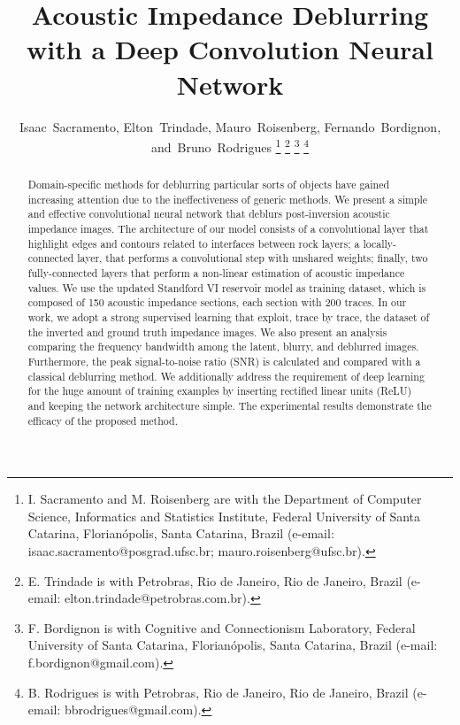 \documentclass[journal]{IEEEtran}
\begin{document}
\title{Acoustic Impedance Deblurring with a Deep Convolution Neural Network}


\author{Isaac~Sacramento,
        Elton~Trindade,
        Mauro~Roisenberg,
        Fernando~Bordignon,
        and~Bruno~Rodrigues
\thanks{I. Sacramento and M. Roisenberg are with the Department of Computer Science, Informatics and Statistics Institute,
Federal University of Santa Catarina, Florianópolis, Santa Catarina, Brazil (e-email: isaac.sacramento@posgrad.ufsc.br;
mauro.roisenberg@ufsc.br).}%
\thanks{E. Trindade is with Petrobras, Rio de Janeiro, Rio de Janeiro, Brazil (e-email: elton.trindade@petrobras.com.br).}%
\thanks{F. Bordignon is with Cognitive and Connectionism Laboratory, Federal University of Santa Catarina, Florianópolis,
Santa Catarina, Brazil (e-mail: f.bordignon@gmail.com).}
\thanks{B. Rodrigues is with Petrobras, Rio de Janeiro, Rio de Janeiro, Brazil (e-email: bbrodrigues@gmail.com).}}

\markboth{}%
{}%

\maketitle

\begin{abstract}
Domain-specific methods for deblurring particular sorts of
objects have gained increasing attention due to the ineffectiveness
of generic methods.
We present a simple and effective convolutional
neural network that deblurs post-inversion acoustic impedance images. 
The architecture of our model consists of a convolutional layer
that highlight edges and contours related to
interfaces between rock layers; a locally-connected
layer, that performs a convolutional step with unshared weights;
finally, two fully-connected layers that
perform a non-linear estimation of acoustic impedance values.
We use the updated Standford VI reservoir model as training dataset,
which is composed of 150 acoustic impedance sections, each section with
200 traces. In our work, we adopt a strong supervised learning
that exploit, trace by trace, the dataset of the inverted and ground truth impedance images.
We also present an analysis comparing the frequency bandwidth among 
the latent, blurry, and deblurred images. Furthermore, the peak signal-to-noise ratio (SNR)
is calculated and compared with a classical deblurring method.
We additionally address the requirement of deep learning for the huge amount
of training examples by inserting rectified linear units (ReLU) and keeping
the network architecture simple. 
The experimental results demonstrate the efficacy of the proposed method.
\end{abstract}
\end{document}
